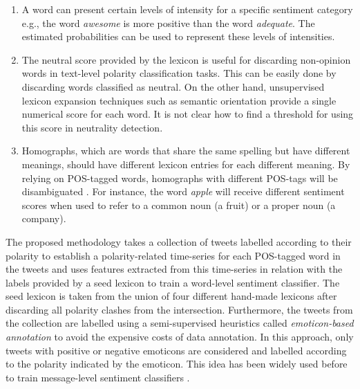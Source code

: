 \documentclass{sig-alternate}
\begin{document}
\begin{enumerate}
\item A word can present certain levels of intensity \cite{ThelwallBP12} for a specific sentiment category e.g., the word \emph{awesome} is more positive than the word \emph{adequate}. The estimated probabilities can be used to represent these levels of intensities.

\item  The neutral score provided by the lexicon is useful for discarding non-opinion words in text-level polarity classification tasks. This can be easily done by discarding words classified as neutral. On the other hand, unsupervised lexicon expansion techniques such as semantic orientation \cite{Turney2002} provide a single numerical score for each word. It is not clear how to find a threshold for using this score in neutrality detection. 

\item   Homographs, which are  words that share the same spelling but have different meanings, should  have different lexicon entries for each different meaning. By relying on POS-tagged words, homographs with different POS-tags will be disambiguated \cite{wilks1998grammar}. For instance, the word \emph{apple}  will receive different sentiment scores when used to refer to a common noun (a fruit) or a proper noun (a company). 

\end{enumerate}


The proposed methodology takes a collection of tweets labelled according to their polarity to establish a polarity-related time-series for each POS-tagged word in the tweets and uses features extracted from this time-series in relation with the labels provided by a seed lexicon to train a word-level sentiment classifier. The seed lexicon is taken from the union of four different hand-made lexicons after discarding all polarity clashes from the intersection. Furthermore, the tweets from the collection are labelled using a semi-supervised heuristics called \emph{emoticon-based annotation} to avoid the expensive costs of data annotation. In this approach, only tweets with positive or negative emoticons are considered and labelled according to the polarity indicated by the emoticon. This idea has been widely used before to train message-level sentiment classifiers \cite{bifet2010, go2010, pak2010twitter}.
\end{document}

